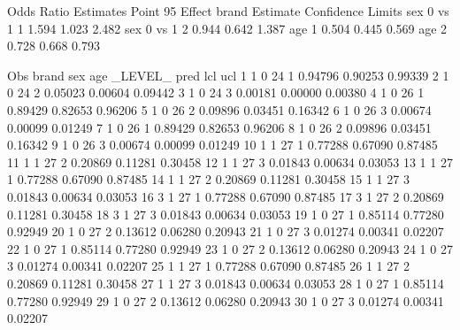 \documentclass{article}
\begin{document}
\begin{Woutput}
                 Odds Ratio Estimates
                          Point          95%
Effect        brand    Estimate      Confidence Limits
sex 0 vs 1    1           1.594       1.023       2.482
sex 0 vs 1    2           0.944       0.642       1.387
age           1           0.504       0.445       0.569
age           2           0.728       0.668       0.793

 Obs    brand    sex    age    _LEVEL_      pred       lcl        ucl
   1      1       0      24       1       0.94796    0.90253    0.99339
   2      1       0      24       2       0.05023    0.00604    0.09442
   3      1       0      24       3       0.00181    0.00000    0.00380
   4      1       0      26       1       0.89429    0.82653    0.96206
   5      1       0      26       2       0.09896    0.03451    0.16342
   6      1       0      26       3       0.00674    0.00099    0.01249
   7      1       0      26       1       0.89429    0.82653    0.96206
   8      1       0      26       2       0.09896    0.03451    0.16342
   9      1       0      26       3       0.00674    0.00099    0.01249
  10      1       1      27       1       0.77288    0.67090    0.87485
  11      1       1      27       2       0.20869    0.11281    0.30458
  12      1       1      27       3       0.01843    0.00634    0.03053
  13      1       1      27       1       0.77288    0.67090    0.87485
  14      1       1      27       2       0.20869    0.11281    0.30458
  15      1       1      27       3       0.01843    0.00634    0.03053
  16      3       1      27       1       0.77288    0.67090    0.87485
  17      3       1      27       2       0.20869    0.11281    0.30458
  18      3       1      27       3       0.01843    0.00634    0.03053
  19      1       0      27       1       0.85114    0.77280    0.92949
  20      1       0      27       2       0.13612    0.06280    0.20943
  21      1       0      27       3       0.01274    0.00341    0.02207
  22      1       0      27       1       0.85114    0.77280    0.92949
  23      1       0      27       2       0.13612    0.06280    0.20943
  24      1       0      27       3       0.01274    0.00341    0.02207
  25      1       1      27       1       0.77288    0.67090    0.87485
  26      1       1      27       2       0.20869    0.11281    0.30458
  27      1       1      27       3       0.01843    0.00634    0.03053
  28      1       0      27       1       0.85114    0.77280    0.92949
  29      1       0      27       2       0.13612    0.06280    0.20943
  30      1       0      27       3       0.01274    0.00341    0.02207

\end{Woutput}
\end{document}
